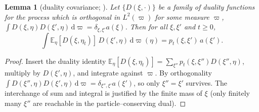 \documentclass[11pt]{article}
\theoremstyle{plain}
\newtheorem{lemma}[theorem]{Lemma}
\theoremstyle{definition}
\theoremstyle{remark}
\newcommand{\E}{\mathbb{E}}\newcommand{\PP}{\mathbb{P}}\newcommand{\dd}{\,\mathrm{d}}
\begin{document}
\begin{lemma}[duality covariance; {\cite[Lem.~2.1]{ACR}}]\label{lem:acr}
Let $\{D(\xi,\cdot)\}$ be a family of duality functions for the process which is
orthogonal in $L^2(\varpi)$ for some measure $\varpi$,
$\int D(\xi,\eta)D(\xi',\eta)\dd\varpi=\delta_{\xi,\xi'}a(\xi)$. Then for all
$\xi,\xi'$ and $t\ge0$,
\[
  \int \E_\eta[D(\xi,\eta_t)]\,D(\xi',\eta)\dd\varpi(\eta)=p_t(\xi,\xi')\,a(\xi').
\]
\end{lemma}
\begin{proof}
Insert the duality identity
$\E_\eta[D(\xi,\eta_t)]=\sum_{\xi''}p_t(\xi,\xi'')D(\xi'',\eta)$, multiply by
$D(\xi',\eta)$, and integrate against $\varpi$. By orthogonality
$\int D(\xi'',\eta)D(\xi',\eta)\dd\varpi=\delta_{\xi'',\xi'}a(\xi')$, so only
$\xi''=\xi'$
survives. The interchange of sum and integral is justified by the finite mass of
$\xi$ (only finitely many $\xi''$ are reachable in the particle--conserving dual).
\end{proof}
\end{document}
